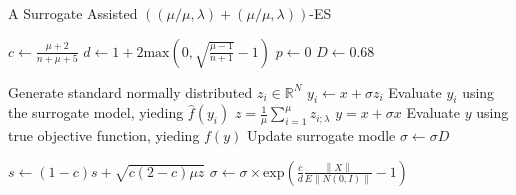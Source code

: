

\begin{algorithm}
\caption{A Surrogate Assisted $( (\mu/\mu,\lambda)+(\mu/\mu,\lambda) )$-ES}
\label{alg}
\begin{algorithmic}[1]
\STATE $c \leftarrow  \frac{\mu +2}{n+\mu+5}$ 
\STATE $d \leftarrow 1 + 2 \text{max}(0, \sqrt{\frac{\mu - 1}{n+1} } - 1 ) $
\STATE $p \leftarrow 0$
\STATE $D \leftarrow 0.68$

		\STATE Generate standard normally distributed $z_i \in \mathbb{R}^N $
		\STATE $y_i \leftarrow x + \sigma z_i$
		\STATE Evaluate $y_i$ using the surrogate model, yieding $\hat{f}(y_i)$
	\ENDFOR
	\STATE $z = \frac{1}{\mu} \sum_{i=1}^{\mu} z_{i;\lambda}$
	\STATE $y = x + \sigma x$
	\STATE Evaluate $y$ using true objective function, yieding $f(y)$
	\STATE Update surrogate modle 
		\STATE $\sigma \leftarrow \sigma D$
		
	\ELSE
		\STATE $s \leftarrow (1-c)s + \sqrt{ c(2-c) \mu z}$
		\STATE $\sigma \leftarrow \sigma \times \text{exp} \left(\frac{c}{d} \frac{\left\lVert X \right\rVert} { E \left\lVert N(0,I) \right\rVert} -1 \right )$
		
	\ENDIF

\ENDWHILE

\end{algorithmic}
\end{algorithm}



		
